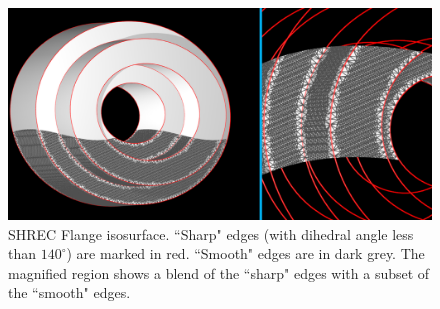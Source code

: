 \begin{figure}[tb]
\includegraphics[width=\linewidth]{images/shrecFlangeCombine2.eps}
\caption{SHREC Flange isosurface. ``Sharp" edges (with dihedral angle less than $140^\circ$) are marked in red. 
``Smooth" edges are in dark grey. The magnified region shows a blend of the ``sharp" edges with a subset of the ``smooth" edges.}
\label{fig:flange1}
\end{figure}


